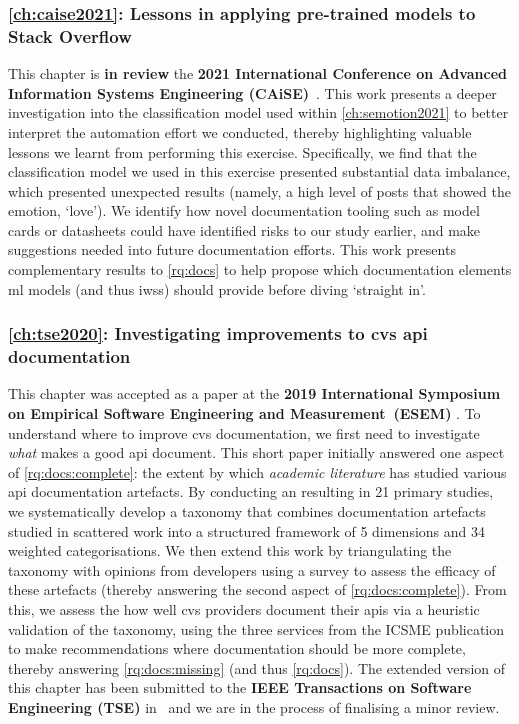 \subsubsection{\cref{ch:caise2021}: Lessons in applying pre-trained models to Stack Overflow} This chapter is \textbf{in review} the \textbf{2021 International Conference on Advanced Information Systems Engineering (CAiSE)}~\citep{Graetsch:2021caise}. This work presents a deeper investigation into the classification model used within \cref{ch:semotion2021} to better interpret the automation effort we conducted, thereby highlighting valuable lessons we learnt from performing this exercise. Specifically, we find that the classification model we used in this exercise presented substantial data imbalance, which presented unexpected results (namely, a high level of posts that showed the emotion, `love'). We identify how novel documentation tooling such as model cards \citep{Mitchell:2018in} or datasheets \citep{Gebru:2018wh} could have identified risks to our study earlier, and make suggestions needed into future documentation efforts. This work presents complementary  results to \ref{rq:docs} to help propose which documentation elements \gls{ml} models (and thus \glspl{iws}) should provide before diving `straight in'.

\subsubsection{\cref{ch:tse2020}: Investigating improvements to \gls{cvs} \gls{api} documentation} This chapter was accepted as a paper at the \textbf{2019 International Symposium on Empirical Software Engineering and Measurement~(ESEM)} \citep{Cummaudo:2020icse}. To understand where to improve \gls{cvs} documentation, we first need to investigate \textit{what} makes a good \gls{api} document. This short paper initially answered one aspect of \ref{rq:docs:complete}: the extent by which \textit{academic literature} has studied various \gls{api} documentation artefacts. By conducting an  resulting in 21 primary studies, we systematically develop a taxonomy that combines documentation artefacts studied in scattered work into a structured framework of 5 dimensions and 34 weighted categorisations. We then extend this work by triangulating the taxonomy with opinions from developers using a survey to assess the efficacy of these artefacts (thereby answering the second aspect of \ref{rq:docs:complete}). From this, we assess the how well \gls{cvs} providers document their \glspl{api} via a heuristic validation of the taxonomy, using the three services from the ICSME publication to make recommendations where documentation should be more complete, thereby answering \ref{rq:docs:missing} (and thus \ref{rq:docs}). The extended version of this chapter has been submitted to the \textbf{IEEE Transactions on Software Engineering (TSE)} in~\citep{Cummaudo:2020tse} and we are in the process of finalising a minor review.

